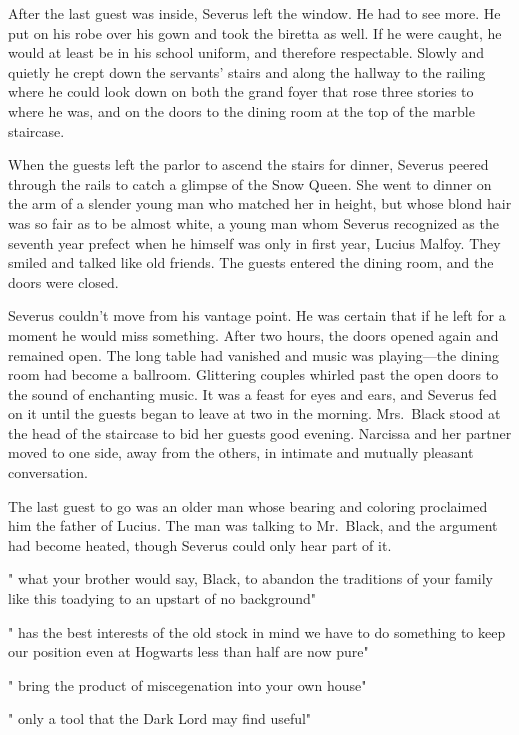 After the last guest was inside, Severus left the window. He had to see more. He put on his robe over his gown and took the biretta as well. If he were caught, he would at least be in his school uniform, and therefore respectable. Slowly and quietly he crept down the servants' stairs and along the hallway to the railing where he could look down on both the grand foyer that rose three stories to where he was, and on the doors to the dining room at the top of the marble staircase.

When the guests left the parlor to ascend the stairs for dinner, Severus peered through the rails to catch a glimpse of the Snow Queen. She went to dinner on the arm of a slender young man who matched her in height, but whose blond hair was so fair as to be almost white, a young man whom Severus recognized as the seventh year prefect when he himself was only in first year, Lucius Malfoy. They smiled and talked like old friends. The guests entered the dining room, and the doors were closed.

Severus couldn't move from his vantage point. He was certain that if he left for a moment he would miss something. After two hours, the doors opened again and remained open. The long table had vanished and music was playing—the dining room had become a ballroom. Glittering couples whirled past the open doors to the sound of enchanting music. It was a feast for eyes and ears, and Severus fed on it until the guests began to leave at two in the morning. Mrs.~Black stood at the head of the staircase to bid her guests good evening. Narcissa and her partner moved to one side, away from the others, in intimate and mutually pleasant conversation.

The last guest to go was an older man whose bearing and coloring proclaimed him the father of Lucius. The man was talking to Mr.~Black, and the argument had become heated, though Severus could only hear part of it.

"{\el} what your brother would say, Black, to abandon the traditions of your family like this{\el} toadying to an upstart of no background{\el}"

"{\el} has the best interests of the old stock in mind{\el} we have to do something to keep our position{\el} even at Hogwarts less than half are now pure{\el}"

"{\el} bring the product of miscegenation into your own house{\el}"

"{\el} only a tool that the Dark Lord may find useful{\el}"

